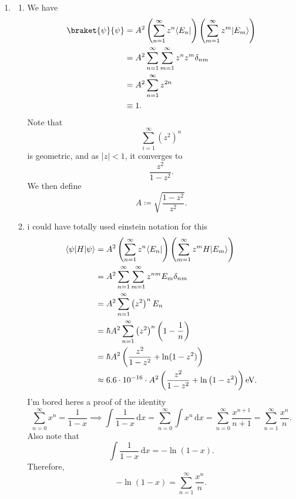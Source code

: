 \documentclass[11pt, letterpaper]{article}
\begin{document}
\begin{enumerate}
\[		.\]
		Therefore, and factoring in the $s ^{-1} $ that I have omitted writing for the entirety of the problem,
		\[
			\lim_{n \to \infty} E_n=\hbar s ^{-1} \approx 6.6\cdot 10^{-16}\text{eV} 
		.\]
	\item 
		\begin{enumerate}
			\item We have
				\begin{align*}
					\braket{\psi }{\psi } &=A^2\left( \sum_{n=1}^{\infty} z^n \bra{E_n}  \right) \left( \sum_{m=1}^{\infty} z^m\ket{E_m}  \right) \\
							      &=A^2 \sum_{n=1}^{\infty} \sum_{m=1}^{\infty} z^nz^m\delta_{nm} \\
							      &=A^2 \sum_{n=1}^{\infty} z^{2n} \\
							      &\equiv 1
				.\end{align*}
				Note that
				\[
					\sum_{i=1}^{\infty} \left( z^2 \right) ^n
				\]
				is geometric, and as $\left| z \right| <1$, it converges to
				\[
					\frac{z^2}{1-z^2} 
				.\]
				We then define
				\[
					A\coloneqq \sqrt{\frac{1-z^2}{z^2} } 
				.\]
			\item i could have totally used einstein notation for this
				\begin{align*}
					\langle\psi \rvert H\lvert\psi \rangle &=A^2\left( \sum_{n=1}^{\infty} z^n\langle E_n\rvert  \right) \left( \sum_{m=1}^{\infty} z^mH\lvert E_m\rangle  \right) \\
								 &=A^2 \sum_{n=1}^{\infty} \sum_{m=1}^{\infty} z^{nm} E_m\delta_{nm} \\
								 &=A^2 \sum_{n=1}^{\infty} \left( z^2 \right)^n E_n \\
								 &=\hbar A^2 \sum_{n=1}^{\infty} \left( z^2 \right) ^n\left( 1 -\frac{1}{n}  \right) \\
								 &=\hbar A^2\left( \frac{z^2}{1-z^2} +\ln (1-z^2) \right) \\
								 &\approx 6.6\cdot 10^{-16} \cdot A^2\left( \frac{z^2}{1-z^2} +\ln \left( 1-z^2 \right)  \right) \text{eV} 
				.\end{align*}
				I'm bored heres a proof of the identity
				\[
					\sum_{n=0}^{\infty} x^n=\frac{1}{1-x} \implies \int \frac{1}{1-x}  \,\mathrm{d} x=\sum_{n=0}^{\infty} \int x^n \,\mathrm{d} x=\sum_{n=0}^{\infty} \frac{x^{n+1} }{n+1} =\sum_{n=1}^{\infty} \frac{x^n}{n} 
				.\]
				Also note that
				\[
					\int \frac{1}{1-x}  \,\mathrm{d} x=-\ln (1-x)
				.\]
				Therefore,
				\[
					-\ln (1-x)=\sum_{n=1}^{\infty} \frac{x^n}{n} 
				.\]
		\end{enumerate}
		
\end{enumerate}
\end{document}
